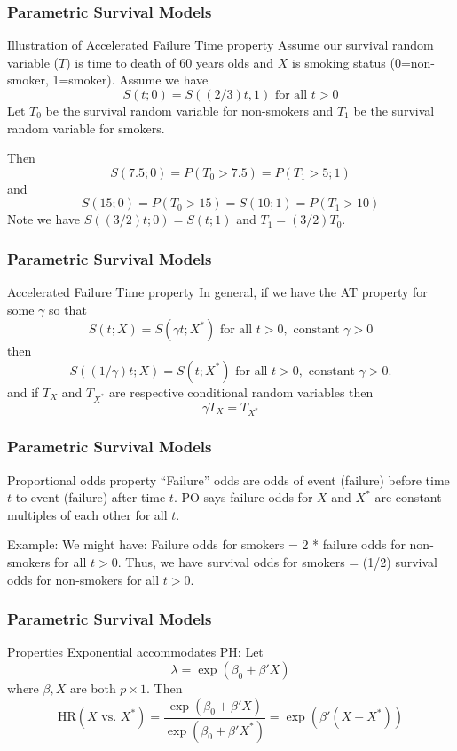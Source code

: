\documentclass{beamer}
\theoremstyle{definition}
\begin{document}
 
\begin{frame}
\frametitle{Parametric Survival Models}
\begin{block}{Illustration of Accelerated Failure Time property} 
Assume our survival random variable ($T$) is time to death of 60 years olds and $X$ is smoking status (0=non-smoker, 1=smoker).
Assume we have
\[
S(t;0) = S((2/3)t,1) \text{ for all } t>0
\]
Let $T_0$ be the survival random variable for non-smokers and $T_1$ be the survival random variable for smokers.

Then
\[ S(7.5;0) = P(T_0>7.5) = P(T_1>5;1) \]
 and
\[S(15;0) = P(T_0>15) = S(10;1) = P(T_1>10)
\]
Note we have $S((3/2)t;0) = S(t;1)$ and $T_1=(3/2)T_0$. 
\end{block}
\end{frame}


\begin{frame}
\frametitle{Parametric Survival Models}
\begin{block}{Accelerated Failure Time property} 
In general, if we have the AT property for some $\gamma$ so that
\[ S(t;X) =  S(\gamma t;X^*)  \text{ for all } t>0, \text{ constant } \gamma > 0
\]
then
 \[ S((1/\gamma)t;X) =  S( t;X^*)  \text{ for all } t>0, \text{ constant } \gamma > 0.
\]
and if $T_X$ and $T_{X^*}$ are respective conditional random variables then
\[
\gamma T_X = T_{X^*}
\]
\end{block} 
\end{frame} 


\begin{frame}
\frametitle{Parametric Survival Models}
\begin{block}{Proportional odds property} 
``Failure'' odds are odds of event (failure) before time $t$ to event (failure) after time $t$. PO says failure odds for $X$ and $X^*$ are constant multiples of each other for all $t$. 
\vspace{10pt} 

Example: We might have: Failure odds for smokers = 2 * failure odds for non-smokers for all $t>0$. Thus, we have survival odds for smokers = (1/2) survival odds for non-smokers for all $t>0$.
\end{block}
\end{frame} 

\begin{frame}
\frametitle{Parametric Survival Models}
\begin{block}{Properties}
Exponential accommodates PH: Let
\[
\lambda=\exp(\beta_0 + \beta' X)
\] where $\beta, X$ are both $p \times 1$.
Then
\[
\text{HR}(X \text{ vs. } X^*)  = \dfrac{\exp(\beta_0 + \beta' X)}{\exp(\beta_0 + \beta' X^*)} = \exp(\beta'(X - X^*))
\]
\end{block}
\end{frame} 
\end{document}
